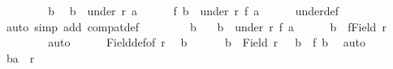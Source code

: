 \begin{isabellebody}
\ \ \isamarkupfalse%
\isanewline
\ \ \ \ \isamarkupfalse%
\ b\ \isamarkupfalse%
\ {\isachardoublequoteopen}b\ {\isasymin}\ under\ r\ a{\isachardoublequoteclose}\isanewline
\ \ \ \ \isamarkupfalse%
\ {\isachardoublequoteopen}f\ b\ {\isasymin}\ under\ r{\isacharprime}{\kern0pt}\ {\isacharparenleft}{\kern0pt}f\ a{\isacharparenright}{\kern0pt}{\isachardoublequoteclose}\isanewline
\ \ \ \ \isamarkupfalse%
\ under{\isacharunderscore}{\kern0pt}def\ \isamarkupfalse%
\ {\isacharasterisk}{\kern0pt}{\isacharasterisk}{\kern0pt}\isanewline
\ \ \ \ \isamarkupfalse%
\ {\isacharparenleft}{\kern0pt}auto\ simp\ add{\isacharcolon}{\kern0pt}\ compat{\isacharunderscore}{\kern0pt}def{\isacharparenright}{\kern0pt}\isanewline
\ \ \isamarkupfalse%
\isanewline
\ \ \ \ \isamarkupfalse%
\ b{\isacharprime}{\kern0pt}\ \isamarkupfalse%
\ {\isacharasterisk}{\kern0pt}{\isacharasterisk}{\kern0pt}{\isacharasterisk}{\kern0pt}{\isacharasterisk}{\kern0pt}{\isacharasterisk}{\kern0pt}{\isacharcolon}{\kern0pt}\ {\isachardoublequoteopen}b{\isacharprime}{\kern0pt}\ {\isasymin}\ under\ r{\isacharprime}{\kern0pt}\ {\isacharparenleft}{\kern0pt}f\ a{\isacharparenright}{\kern0pt}{\isachardoublequoteclose}\isanewline
\ \ \ \ \isamarkupfalse%
\ {\isachardoublequoteopen}b{\isacharprime}{\kern0pt}\ {\isasymin}\ f{\isacharbackquote}{\kern0pt}{\isacharparenleft}{\kern0pt}Field\ r{\isacharparenright}{\kern0pt}{\isachardoublequoteclose}\isanewline
\ \ \ \ \isamarkupfalse%
\ {}\ \isamarkupfalse%
\ auto\isanewline
\ \ \ \ \isamarkupfalse%
\ Field{\isacharunderscore}{\kern0pt}def{\isacharbrackleft}{\kern0pt}of\ r{\isacharbrackright}{\kern0pt}\ \isamarkupfalse%
\ b\ \isanewline
\ \ \ \ {}{\isacharcolon}{\kern0pt}\ {\isachardoublequoteopen}b\ {\isasymin}\ Field\ r{\isachardoublequoteclose}\ \ {}{\isacharcolon}{\kern0pt}\ {\isachardoublequoteopen}b{\isacharprime}{\kern0pt}\ {\isacharequal}{\kern0pt}\ f\ b{\isachardoublequoteclose}\ \isamarkupfalse%
\ auto\isanewline
\ \ \ \ \isamarkupfalse%
\ {\isachardoublequoteopen}{\isacharparenleft}{\kern0pt}b{\isacharcomma}{\kern0pt}a{\isacharparenright}{\kern0pt}\ {\isasymin}\ r{\isachardoublequoteclose}\isanewline
\ \ \ \ \isamarkupfalse%
{\isacharminus}{\kern0pt}\isanewline
\ \ \ \ \ \ \isacommand{{\isacharbraceleft}{\kern0pt}}\isamarkupfalse%

\end{isabellebody}
